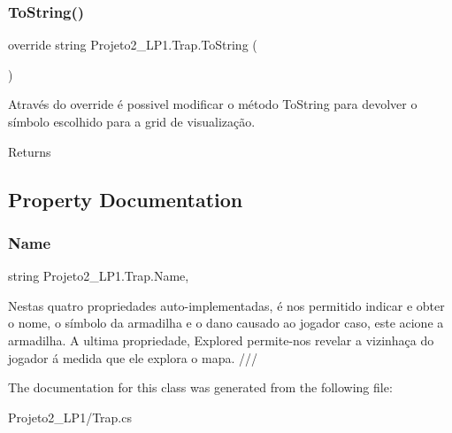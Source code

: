 \subsubsection{\texorpdfstring{To\+String()}{ToString()}}
{\footnotesize\ttfamily override string Projeto2\+\_\+\+L\+P1.\+Trap.\+To\+String (\begin{DoxyParamCaption}{ }\end{DoxyParamCaption})\hspace{0.3cm}{\ttfamily [inline]}}



Através do override é possivel modificar o método To\+String para devolver o símbolo escolhido para a grid de visualização. 

\begin{DoxyReturn}{Returns}

\end{DoxyReturn}


\subsection{Property Documentation}
\mbox{\label{class_projeto2___l_p1_1_1_trap_a8e8d228475e53830ada606ef606d3d5b}} 
\subsubsection{\texorpdfstring{Name}{Name}}
{\footnotesize\ttfamily string Projeto2\+\_\+\+L\+P1.\+Trap.\+Name\hspace{0.3cm}{\ttfamily [get]}, {\ttfamily [set]}}



Nestas quatro propriedades auto-\/implementadas, é nos permitido indicar e obter o nome, o símbolo da armadilha e o dano causado ao jogador caso, este acione a armadilha. A ultima propriedade, Explored permite-\/nos revelar a vizinhaça do jogador á medida que ele explora o mapa. /// 



The documentation for this class was generated from the following file\+:\begin{DoxyCompactItemize}
\item 
Projeto2\+\_\+\+L\+P1/Trap.\+cs\end{DoxyCompactItemize}
